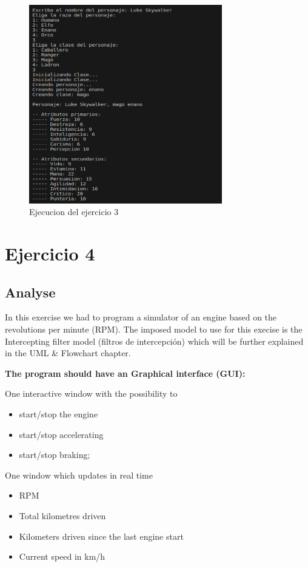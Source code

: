 \documentclass{article}
\begin{document}
\begin{figure}[h]
	\centering
        \vspace{15pt}
	\includegraphics[width=0.75\textwidth]{DS_ejecucion_ej3.png}
	\caption{Ejecucion del ejercicio 3}
	\label{fig:ejecucion_ej3}
\end{figure}

\newpage
\section{Ejercicio 4}
\subsection{Analyse}
In this exercise we had to program a simulator of an engine based on the revolutions per minute (RPM). The imposed model to use for this execise is the Intercepting filter model (filtros de intercepción) which will be further explained in the UML & Flowchart chapter. 
\vspace{15pt}
\item \textbf{The program should have an Graphical interface (GUI):} 
\item One interactive window with the possibility to
\begin{itemize}
   
\item start/stop the engine 
\item start/stop accelerating 
\item start/stop braking;
\end{itemize}
 \item One window which updates in real time 
 \begin{itemize}
     \item RPM 
     \item Total kilometres driven 
     \item Kilometers driven since the last engine start 
     \item Current speed in km/h
 \end{itemize}
 
\end{document}

